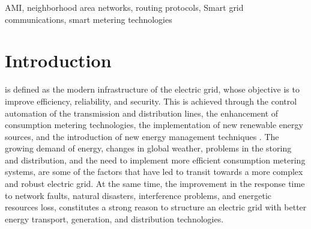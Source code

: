 \documentclass[11pt,draftclsnofoot,onecolumn]{IEEEtran}
\begin{document}
\begin{IEEEkeywords}
AMI, neighborhood area networks, routing protocols, Smart grid communications, smart metering technologies
\end{IEEEkeywords}






%
\IEEEpeerreviewmaketitle


\section{Introduction}
 is defined as the modern infrastructure of the electric grid, whose objective is to improve efficiency, reliability, and security. This is achieved through the control automation of the transmission and distribution lines, the enhancement of consumption metering technologies, the implementation of new renewable energy sources, and the introduction of new energy management techniques \cite{Gungor2011}. The growing demand of energy, changes in global weather, problems in the storing and distribution, and the need to implement more efficient consumption metering systems, are some of the factors that have led to transit towards a more complex and robust electric grid. At the same time, the improvement in the response time to network faults, natural disasters, interference problems, and energetic resources loss, constitutes a strong reason to structure an electric grid with better energy transport, generation, and distribution technologies.

\end{document}
